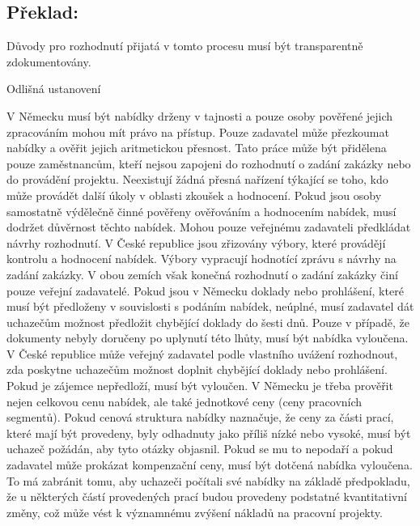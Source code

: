 \documentclass[10pt]{article}
\begin{document}
\pagebreak

\subsection*{Překlad:}

Důvody pro rozhodnutí přijatá v tomto procesu musí být transparentně zdokumentovány.


Odlišná ustanovení

V Německu musí být nabídky drženy v tajnosti a pouze osoby pověřené jejich zpracováním mohou mít právo na přístup.
Pouze zadavatel může přezkoumat nabídky a ověřit jejich aritmetickou přesnost.
Tato práce může být přidělena pouze zaměstnancům, kteří nejsou zapojeni do rozhodnutí o zadání zakázky nebo do provádění projektu.
Neexistují žádná přesná nařízení týkající se toho, kdo může provádět další úkoly v oblasti zkoušek a hodnocení.
Pokud jsou osoby samostatně výdělečně činné pověřeny ověřováním a hodnocením nabídek, musí dodržet důvěrnost těchto nabídek.
Mohou pouze veřejnému zadavateli předkládat návrhy rozhodnutí.
V České republice jsou zřizovány výbory, které provádějí kontrolu a hodnocení nabídek.
Výbory vypracují hodnotící zprávu s návrhy na zadání zakázky.
V obou zemích však konečná rozhodnutí o zadání zakázky činí pouze veřejní zadavatelé.
Pokud jsou v Německu doklady nebo prohlášení, které musí být předloženy v souvislosti s podáním nabídek, neúplné, musí zadavatel dát uchazečům možnost předložit chybějící doklady do šesti dnů.
Pouze v případě, že dokumenty nebyly doručeny po uplynutí této lhůty, musí být nabídka vyloučena.
V České republice může veřejný zadavatel podle vlastního uvážení rozhodnout, zda poskytne uchazečům možnost doplnit chybějící doklady nebo prohlášení.
Pokud je zájemce nepředloží, musí být vyloučen.
V Německu je třeba prověřit nejen celkovou cenu nabídek, ale také jednotkové ceny (ceny pracovních segmentů).
Pokud cenová struktura nabídky naznačuje, že ceny za části prací, které mají být provedeny, byly odhadnuty jako příliš nízké nebo vysoké, musí být uchazeč požádán, aby tyto otázky objasnil.
Pokud se mu to nepodaří a pokud zadavatel může prokázat kompenzační ceny, musí být dotčená nabídka vyloučena.
To má zabránit tomu, aby uchazeči počítali své nabídky na základě předpokladu, že u některých částí provedených prací budou provedeny podstatné kvantitativní změny, což může vést k významnému zvýšení nákladů na pracovní projekty.
\end{document}
